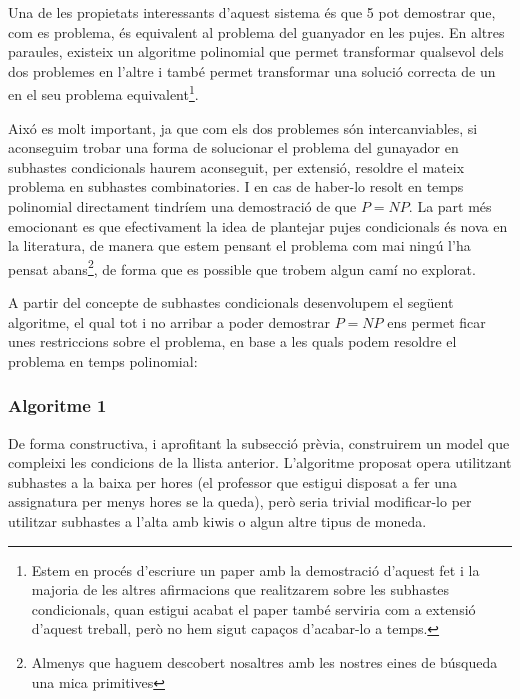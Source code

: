 \documentclass[10pt,twocolumn]{article}
\begin{document}
Una de les propietats interessants d'aquest sistema és que 5 pot demostrar que, com es problema, és equivalent al problema del guanyador en les pujes. En altres paraules, existeix un algoritme polinomial que permet transformar qualsevol dels dos problemes en l'altre i també permet transformar una solució correcta de un en el seu problema equivalent\footnote{Estem en procés d'escriure un paper amb la demostració d'aquest fet i la majoria de les altres afirmacions que realitzarem sobre les subhastes condicionals, quan estigui acabat el paper també serviria com a extensió d'aquest treball, però no hem sigut capaços d'acabar-lo a temps.}. 

Aixó es molt important, ja que com els dos problemes són intercanviables, si aconseguim trobar una forma de solucionar el problema del gunayador en subhastes condicionals haurem aconseguit, per extensió, resoldre el mateix problema en subhastes combinatories. I en cas de haber-lo resolt en temps polinomial directament tindríem una demostració de que $P=NP$. La part més emocionant es que efectivament la idea de plantejar pujes condicionals és nova en la literatura, de manera que estem pensant el problema com mai ningú l'ha pensat abans\footnote{Almenys que haguem descobert nosaltres amb les nostres eines de búsqueda una mica primitives}, de forma que es possible que trobem algun camí no explorat.

A partir del concepte de subhastes condicionals desenvolupem el següent algoritme, el qual tot i no arribar a poder demostrar $P=NP$ ens permet ficar unes restriccions sobre el problema, en base a les quals podem resoldre el problema en temps polinomial:

\subsubsection{Algoritme 1}

De forma constructiva, i aprofitant la subsecció prèvia, construirem un model que compleixi les condicions  de la llista anterior.
L'algoritme proposat opera utilitzant subhastes a la baixa per hores (el professor que estigui disposat a fer una assignatura per menys hores se la queda), però seria trivial modificar-lo per utilitzar subhastes a l'alta amb kiwis o algun altre tipus de moneda.
\end{document}
